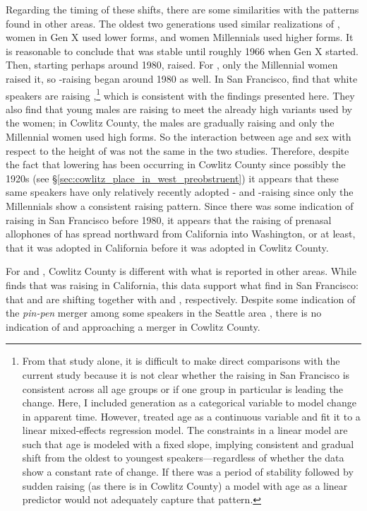 Regarding the timing of these shifts, there are some similarities with the patterns found in other areas. The oldest two generations used similar realizations of \ban, women in Gen X used lower forms, and women Millennials used higher forms. It is reasonable to conclude that \ban was stable until roughly 1966 when Gen X started. Then, starting perhaps around 1980, \ban raised. For \bang, only the Millennial women raised it, so \bang-raising began around 1980 as well. In San Francisco, \citet{cardoso_etal_2016_pads} find that white speakers are raising \ban,\footnote{From that study alone, it is difficult to make direct comparisons with the current study because it is not clear whether the raising in San Francisco is consistent across all age groups or if one group in particular is leading the change. Here, I included generation as a categorical variable to model change in apparent time. However, \citet{cardoso_etal_2016_pads} treated age as a continuous variable and fit it to a linear mixed-effects regression model. The constraints in a linear model are such that age is modeled with a fixed slope, implying consistent and gradual shift from the oldest to youngest speakers---regardless of whether the data show a constant rate of change. If there was a period of stability followed by sudden raising (as there is in Cowlitz County) a model with age as a linear predictor would not adequately capture that pattern.} which is consistent with the findings presented here. They also find that young males are raising \bang to meet the already high variants used by the women; in Cowlitz County, the males are gradually raising \bang and only the Millennial women used high forms. So the interaction between age and sex with respect to the height of \bang was not the same in the two studies. Therefore, despite the fact that \bat lowering has been occurring in Cowlitz County since possibly the 1920s (see \S\ref{sec:cowlitz_place_in_west_preobstruent}) it appears that these same speakers have only relatively recently adopted \ban- and \bang-raising since only the Millennials show a consistent raising pattern. Since there was some indication of raising in San Francisco before 1980, it appears that the raising of prenasal allophones of \trap has spread northward from California into Washington, or at least, that it was adopted in California before it was adopted in Cowlitz County.

For \ben and \bin, Cowlitz County is different with what is reported in other areas. While  \citet{holland_2014_diss} finds that \ben was raising in California, this data support what \citet{cardoso_etal_2016_pads} find in San Francisco: that \ben and \bin are shifting together with \bet and \bit, respectively. Despite some indication of the \textit{pin-pen} merger among some speakers in the Seattle area \citep{scanlon_wassink_2010}, there is no indication of \bin and \ben approaching a merger in Cowlitz County.

